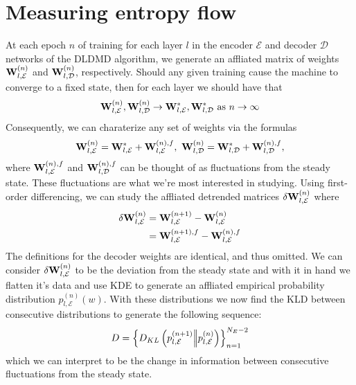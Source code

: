 \section{Measuring entropy flow}
At each epoch $n$ of training for each layer $l$ in the encoder $\mathcal{E}$ and 
decoder $\mathcal{D}$ networks of the DLDMD algorithm, we generate an affliated matrix 
of weights ${\bf W}_{l,\mathcal{E}}^{(n)}$ and ${\bf W}_{l,\mathcal{D}}^{(n)}$, respectively.
Should any given training cause the machine to converge to a fixed state, then for each layer
we should have that
\begin{equation}
    {\bf W}_{l,\mathcal{E}}^{(n)}, {\bf W}_{l,\mathcal{D}}^{(n)} \to 
    {\bf W}_{l,\mathcal{E}}^{*}, {\bf W}_{l,\mathcal{D}}^{*} \text{ as }
    n \to \infty \label{eqn:weight convergence}
\end{equation}
Consequently, we can charaterize any set of weights via the formulas
\begin{equation}
    {\bf W}_{l,\mathcal{E}}^{(n)} = {\bf W}_{l,\mathcal{E}}^{*} + {\bf W}_{l,\mathcal{E}}^{(n),f},\
    {\bf W}_{l,\mathcal{D}}^{(n)} = {\bf W}_{l,\mathcal{D}}^{*} + {\bf W}_{l,\mathcal{D}}^{(n),f},
\end{equation}
where ${\bf W}_{l,\mathcal{E}}^{(n),f}$ and 
${\bf W}_{l,\mathcal{D}}^{(n),f}$ can be thought of as fluctuations from the 
steady state. These fluctuations are what we're 
most interested in studying. Using first-order differencing, we can study the affliated 
detrended matrices $\delta{\bf W}_{l,\mathcal{E}}^{(n)}$ where
\begin{align*}
    \delta{\bf W}_{l,\mathcal{E}}^{(n)} &= {\bf W}_{l,\mathcal{E}}^{(n+1)} - {\bf W}_{l,\mathcal{E}}^{(n)} \\
    &= {\bf W}_{l,\mathcal{E}}^{(n+1),f} - {\bf W}_{l,\mathcal{E}}^{(n),f}
\end{align*}
The definitions for the decoder weights are identical, and thus omitted. We can consider 
$\delta{\bf W}_{l,\mathcal{E}}^{(n)}$ to be the deviation from the steady state and with it 
in hand we flatten it's data and use KDE to generate an affliated empirical probability 
distribution $p_{l,\mathcal{E}}^{(n)}(w)$. With these distributions we now find the KLD 
between consecutive distributions to generate the following sequence: 
\begin{equation}
    D = \left\{D_{KL}\left(p_{l,\mathcal{E}}^{(n+1)} \Big|\!\Big| p_{l,\mathcal{E}}^{(n)}\right)\right\}_{n=1}^{N_E - 2}
\end{equation}
which we can interpret to be the change in information between consecutive fluctuations from the 
steady state.

